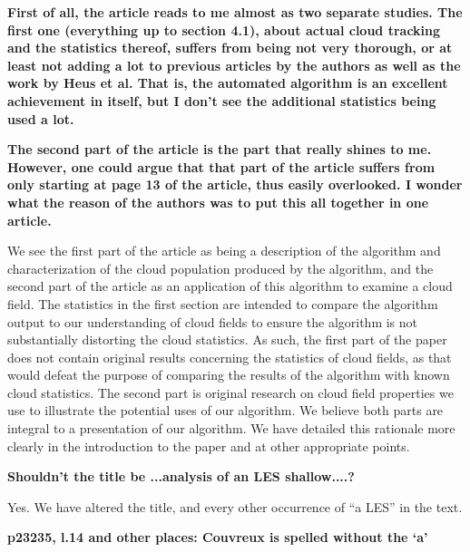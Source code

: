 \documentclass[12pt]{article}
\begin{document}
\textbf{First of all, the article reads to me almost as two separate studies. 
The first one (everything up to section 4.1), about actual cloud tracking and 
the statistics thereof, suffers from being not very thorough, or at least not 
adding a lot to previous articles by the authors as well as the work by Heus et 
al. That is, the automated algorithm is an excellent achievement in itself, but 
I don't see the additional statistics being used a lot.}

\textbf{The second part of the article is the part that really shines to me.
However, one could argue that that part of the article suffers from only 
starting at page 13 of the article, thus easily overlooked. I wonder what the 
reason of the authors was to put this all together in one article.}

\vspace{5mm}

We see the first part of the article as being a description of the algorithm 
and characterization of the cloud population produced by the algorithm, and the
second part of the article as an application of this algorithm to examine a 
cloud field.  The statistics in the first section are intended to compare the
algorithm output to our understanding of cloud fields to ensure the algorithm 
is not substantially distorting the cloud statistics.  As such, the first part 
of the paper does not contain original results concerning the statistics of 
cloud fields, as that would defeat the purpose of comparing the results of the
algorithm with known cloud statistics.  The second part is original research on 
cloud field properties we use to illustrate the potential uses of our 
algorithm. We believe both parts are integral to a presentation of our
algorithm. We have detailed this rationale more clearly in the introduction to 
the paper and at other appropriate points.

\vspace{5mm}

\textbf{Shouldn't the title be ...analysis of an LES shallow....?}

\vspace{5mm}

Yes. We have altered the title, and every other occurrence of ``a LES'' in the 
text.

\vspace{5mm}

\textbf{p23235, l.14 and other places: Couvreux is spelled without the `a'}

\vspace{5mm}
\end{document}
